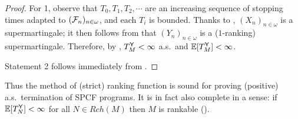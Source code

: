 \begin{proof}
For 1, observe that $T_0, T_1, T_2, \cdots$ are an increasing sequence of stopping times adapted to $(\mathcal{F}_n)_{n \in \omega}$, and each $T_i$ is bounded.
Thanks to , 
$(X_n)_{n \in \omega}$ is a supermartingale;
it then follows from  that $(Y_n)_{n \in \omega}$ is a ($1$-ranking) supermartingale.
Therefore, by , $T^{\textsf{Y}}_M < \infty$ a.s.~and $\mathbb{E}[T^{\textsf{Y}}_M] < \infty$.

Statement 2 follows immediately from .
\end{proof}

Thus the method of (strict) ranking function is sound for proving (positive) a.s.~termination of SPCF programs.
It is in fact also complete in a sense: if $\mathbb{E}[T^{\textsf{Y}}_N] < \infty$ for all $N \in \mathit{Rch}(M)$ then $M$ is rankable ().
